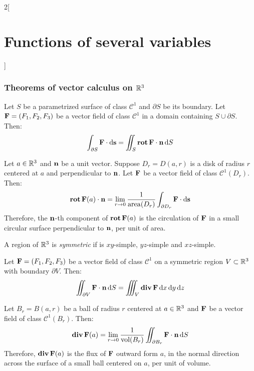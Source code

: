 \documentclass[../../../main.tex]{subfiles}
\begin{document}
\begin{multicols}{2}[\section{Functions of several variables}]
  \subsubsection{Theorems of vector calculus on \texorpdfstring{$\mathbb{R}^3$}{R3}}
  \begin{theorem}
    Let $S$ be a parametrized surface of class $\mathcal{C}^1$ and $\partial S$ be its boundary. Let $\boldsymbol{\mathrm{F}}=(F_1,F_2,F_3)$ be a vector field of class $\mathcal{C}^1$ in a domain containing $S\cup\partial S$. Then: $$\int_{\partial S}\boldsymbol{\mathrm{F}}\cdot \dd{\boldsymbol{\mathrm{s}}}=\iint_S\operatorname{\boldsymbol{\mathrm{rot}}}\boldsymbol{\mathrm{F}}\cdot\boldsymbol{\mathrm{n}} \dd{S}$$
  \end{theorem}
  \begin{corollary}
    Let $a\in\mathbb{R}^3$ and $\boldsymbol{\mathrm{n}}$ be a unit vector. Suppose $D_r=D(a,r)$ is a disk of radius $r$ centered at $a$ and perpendicular to $\boldsymbol{\mathrm{n}}$. Let $\boldsymbol{\mathrm{F}}$ be a vector field of class $\mathcal{C}^1(D_r)$. Then: $$\operatorname{\boldsymbol{\mathrm{rot}}}\boldsymbol{\mathrm{F}}(a)\cdot\boldsymbol{\mathrm{n}}=\lim_{r\to 0}\frac{1}{\operatorname{area}(D_r)}\int_{\partial D_r}\boldsymbol{\mathrm{F}}\cdot \dd{\boldsymbol{\mathrm{s}}}$$ Therefore, the $\boldsymbol{\mathrm{n}}$-th component of $\operatorname{\boldsymbol{\mathrm{rot}}}\boldsymbol{\mathrm{F}}(a)$ is the circulation of $\boldsymbol{\mathrm{F}}$ in a small circular surface perpendicular to $\boldsymbol{\mathrm{n}}$, per unit of area.
  \end{corollary}
  \begin{definition}
    A region of $\mathbb{R}^3$ is \emph{symmetric} if is $xy$-simple, $yz$-simple and $xz$-simple.
  \end{definition}
  \begin{theorem}
    Let $\boldsymbol{\mathrm{F}}=(F_1,F_2,F_3)$ be a vector field of class $\mathcal{C}^1$ on a symmetric region $V\subset\mathbb{R}^3$ with boundary $\partial V$. Then: $$\iint_{\partial V}\boldsymbol{\mathrm{F}}\cdot\boldsymbol{\mathrm{n}} \dd{S}=\iiint_V\operatorname{\boldsymbol{\mathrm{div}}}\boldsymbol{\mathrm{F}}\dd{x}\dd{y}\dd{z}$$
  \end{theorem}
  \begin{corollary}
    Let $B_r=B(a,r)$ be a ball of radius $r$ centered at $a\in\mathbb{R}^3$ and $\boldsymbol{\mathrm{F}}$ be a vector field of class $\mathcal{C}^1(B_r)$. Then: $$\operatorname{\boldsymbol{\mathrm{div}}}\boldsymbol{\mathrm{F}}(a)=\lim_{r\to 0}\frac{1}{\text{vol}(B_r)}\iint_{\partial B_r}\boldsymbol{\mathrm{F}}\cdot\boldsymbol{\mathrm{n}} \dd{S}$$ Therefore, $\operatorname{\boldsymbol{\mathrm{div}}}\boldsymbol{\mathrm{F}}(a)$ is the flux of $\boldsymbol{\mathrm{F}}$ outward form $a$, in the normal direction across the surface of a small ball centered on $a$, per unit of volume.
  \end{corollary}
\end{multicols}
\end{document}
